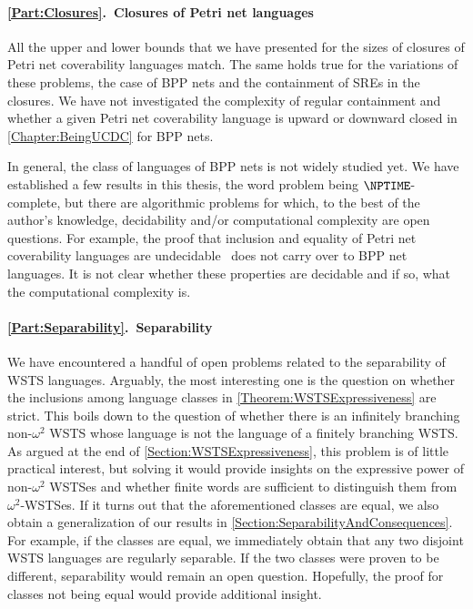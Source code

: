 \documentclass[../../diss.tex]{subfiles}
\begin{document}
\paragraph{\cref{Part:Closures}.~Closures of Petri net languages}

All the upper and lower bounds that we have presented for the sizes of closures of Petri net coverability languages match.
The same holds true for the variations of these problems, \eg the case of BPP nets and the containment of SREs in the closures.
We have not investigated the complexity of regular containment and whether a given Petri net coverability language is upward or downward closed in \cref{Chapter:BeingUCDC} for BPP nets.

In general, the class of languages of BPP nets is not widely studied yet.
We have established a few results in this thesis, \eg the word problem being $\NPTIME$-complete, but there are algorithmic problems for which, to the best of the author's knowledge, decidability and/or computational complexity are open questions.
For example, the proof that inclusion and equality of Petri net coverability languages are undecidable~\cite{Jancar95, Wimmel08} does not carry over to BPP net languages.
It is not clear whether these properties are decidable and if so, what the computational complexity is.

\paragraph{\cref{Part:Separability}.~Separability}

We have encountered a handful of open problems related to the separability of WSTS languages.
Arguably, the most interesting one is the question on whether the inclusions among language classes in \cref{Theorem:WSTSExpressiveness} are strict.
This boils down to the question of whether there is an infinitely branching non-$\omega^2$ WSTS whose language is not the language of a finitely branching WSTS.\@
As argued at the end of \cref{Section:WSTSExpressiveness}, this problem is of little practical interest, but solving it would provide insights on the expressive power of non-$\omega^2$ WSTSes and whether finite words are sufficient to distinguish them from $\omega^2$-WSTSes.
If it turns out that the aforementioned classes are equal, we also obtain a generalization of our results in \cref{Section:SeparabilityAndConsequences}.
For example, if the classes are equal, we immediately obtain that any two disjoint WSTS languages are regularly separable.
If the two classes were proven to be different, separability would remain an open question.
Hopefully, the proof for classes not being equal would provide additional insight.
\end{document}

